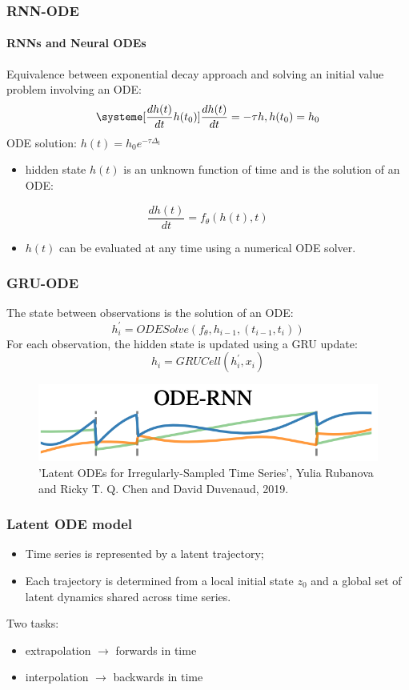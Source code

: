 \documentclass{beamer}
\begin{document}
{%
\begin{frame}
	\frametitle{RNN-ODE}
	\framesubtitle{RNNs and Neural ODEs}
	Equivalence between exponential decay approach and solving an initial value problem involving an ODE:
	\[ \systeme[\frac{dh(t)}{dt} h(t_{0})]{\frac{dh(t)}{dt}=-\tau h, h(t_{0})=h_{0}} \]
	\hfill \break
	\pause ODE solution: $h(t)=h_{0}e^{-\tau \Delta_{t}}$
	\hfill \break
	\begin{itemize}
	\pause \item{hidden state $h(t)$ is an unknown function of time and is the solution of an ODE:}
	\end{itemize}
	$$\frac{dh(t)}{dt}=f_{\theta}(h(t),t)$$
	\begin{itemize}
	\pause \item{$h(t)$ can be evaluated at any time using a numerical ODE solver.}
	\end{itemize}
\end{frame}
\begin{frame}
	\frametitle{GRU-ODE}
	The state between observations is the solution of an ODE:
	$$h_{i}^{'}=ODESolve(f_{\theta}, h_{i-1}, (t_{i-1},t_{i}))$$
	\hfill \break
	\pause For each observation, the hidden state is updated using a GRU update:
	$$h_{i}=GRUCell(h_{i}^{'},x_{i})$$
	\begin{figure}
	\includegraphics[height=0.16\linewidth]{ODE_RNN.png}
	\caption*{'Latent ODEs for Irregularly-Sampled Time Series', Yulia Rubanova and Ricky T. Q. Chen and David Duvenaud, 2019.}
	\end{figure}
\end{frame}
\begin{frame}
	\frametitle{Latent ODE model}
	\begin{itemize}
	\item{Time series is represented by a latent trajectory;}
	\pause \item{Each trajectory is determined from a local initial state $z_{0}$ and a global set of latent dynamics shared across time series.}
	\end{itemize}
	\hfill \break
	\pause Two tasks:
	\begin{itemize}
	\item{extrapolation $\rightarrow$ forwards in time}
	\item{interpolation $\rightarrow$ backwards in time}
	\end{itemize}




\end{frame}}
\end{document}
